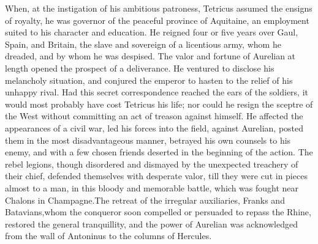 



When, at the instigation of his ambitious patroness, Tetricus
assumed the ensigns of royalty, he was governor of the peaceful
province of Aquitaine, an employment suited to his character and
education. He reigned four or five years over Gaul, Spain, and
Britain, the slave and sovereign of a licentious army, whom he
dreaded, and by whom he was despised. The valor and fortune of
Aurelian at length opened the prospect of a deliverance. He
ventured to disclose his melancholy situation, and conjured the
emperor to hasten to the relief of his unhappy rival. Had this
secret correspondence reached the ears of the soldiers, it would
most probably have cost Tetricus his life; nor could he resign
the sceptre of the West without committing an act of treason
against himself. He affected the appearances of a civil war, led
his forces into the field, against Aurelian, posted them in the
most disadvantageous manner, betrayed his own counsels to his
enemy, and with a few chosen friends deserted in the beginning of
the action. The rebel legions, though disordered and dismayed by
the unexpected treachery of their chief, defended themselves with
desperate valor, till they were cut in pieces almost to a man, in
this bloody and memorable battle, which was fought near Chalons
in Champagne.\footnotemark[50] The retreat of the irregular auxiliaries, Franks
and Batavians,\footnotemark[51] whom the conqueror soon compelled or persuaded
to repass the Rhine, restored the general tranquillity, and the
power of Aurelian was acknowledged from the wall of Antoninus to
the columns of Hercules.

